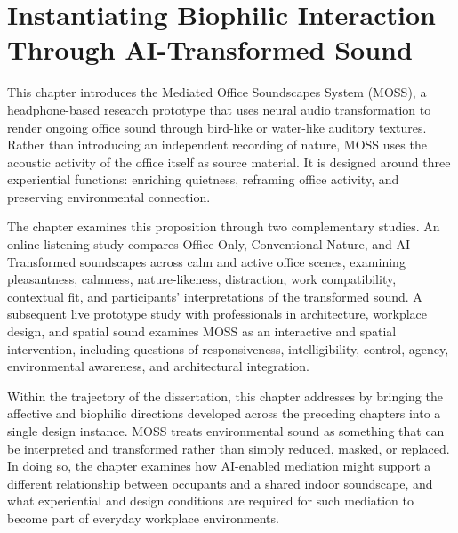 \chapter{Instantiating Biophilic Interaction Through AI-Transformed Sound}
\label{ch:moss}

\begin{synopsis}

This chapter introduces the Mediated Office Soundscapes System (MOSS), a headphone-based research prototype that uses neural audio transformation to render ongoing office sound through bird-like or water-like auditory textures. Rather than introducing an independent recording of nature, MOSS uses the acoustic activity of the office itself as source material. It is designed around three experiential functions: enriching quietness, reframing office activity, and preserving environmental connection.

The chapter examines this proposition through two complementary studies. An online listening study compares Office-Only, Conventional-Nature, and AI-Transformed soundscapes across calm and active office scenes, examining pleasantness, calmness, nature-likeness, distraction, work compatibility, contextual fit, and participants' interpretations of the transformed sound. A subsequent live prototype study with professionals in architecture, workplace design, and spatial sound examines MOSS as an interactive and spatial intervention, including questions of responsiveness, intelligibility, control, agency, environmental awareness, and architectural integration.

Within the trajectory of the dissertation, this chapter addresses  by bringing the affective and biophilic directions developed across the preceding chapters into a single design instance. MOSS treats environmental sound as something that can be interpreted and transformed rather than simply reduced, masked, or replaced. In doing so, the chapter examines how AI-enabled mediation might support a different relationship between occupants and a shared indoor soundscape, and what experiential and design conditions are required for such mediation to become part of everyday workplace environments.
\end{synopsis}


